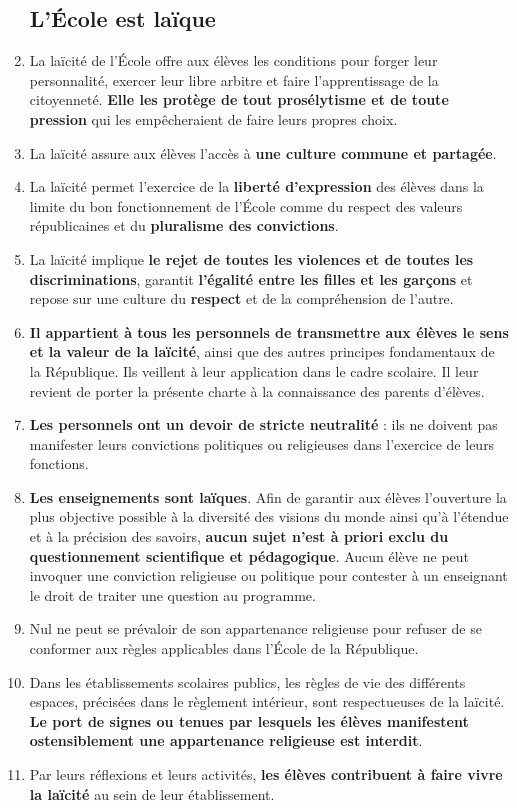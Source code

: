 \begin{enumerate}
\subsection{L'École est laïque}
\item La laïcité de l'École offre aux élèves les conditions pour forger leur personnalité, exercer leur libre arbitre et faire l'apprentissage de la citoyenneté. \textbf{Elle les protège de tout prosélytisme et de toute pression} qui les empêcheraient de faire leurs propres choix.
\item La laïcité assure aux élèves l'accès à \textbf{une culture commune et partagée}.
\item La laïcité permet l'exercice de la \textbf{liberté d'expression} des élèves dans la limite du bon fonctionnement de l'École comme du respect des valeurs républicaines et du \textbf{pluralisme des convictions}.
\item La laïcité implique \textbf{le rejet de toutes les violences et de toutes les discriminations}, garantit \textbf{l'égalité entre les filles et les garçons} et repose sur une culture du \textbf{respect} et de la compréhension de l'autre.
\item \textbf{Il appartient à tous les personnels de transmettre aux élèves le sens et la valeur de la laïcité}, ainsi que des autres principes fondamentaux de la République. Ils veillent à leur application dans le cadre scolaire. Il leur revient de porter la présente charte à la connaissance des parents d'élèves.
\item \textbf{Les personnels ont un devoir de stricte neutralité} : ils ne doivent pas manifester leurs convictions politiques ou religieuses dans l'exercice de leurs fonctions.
\item \textbf{Les enseignements sont laïques}. Afin de garantir aux élèves l'ouverture la plus objective possible à la diversité des visions du monde ainsi qu'à l'étendue et à la précision des savoirs, \textbf{aucun sujet n'est à priori exclu du questionnement scientifique et pédagogique}. Aucun élève ne peut invoquer une conviction religieuse ou politique pour contester à un enseignant le droit de traiter une question au programme.
\item Nul ne peut se prévaloir de son appartenance religieuse pour refuser de se conformer aux règles applicables dans l'École de la République.
\item Dans les établissements scolaires publics, les règles de vie des différents espaces, précisées dans le règlement intérieur, sont respectueuses de la laïcité. \textbf{Le port de signes ou tenues par lesquels les élèves manifestent ostensiblement une appartenance religieuse est interdit}.
\item Par leurs réflexions et leurs activités, \textbf{les élèves contribuent à faire vivre la laïcité} au sein de leur établissement.
\end{enumerate}
